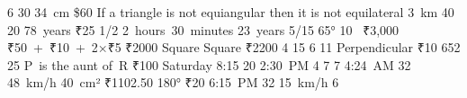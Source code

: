\answerkey
{} 6
 30
 34 cm
 \$60
 If a triangle is not equiangular then it is not equilateral
 3 km
 40
 20
 78 years
 ₹25
 1/2
 2 hours 30 minutes
 23 years
 5/15
 65°
 10 %
 ₹3,000
 ₹50 + ₹10 + 2×₹5
 ₹2000
 Square
 Square
 ₹2200
 4
 15
 6
 11
 Perpendicular
 ₹10
 652
 25
 P is the aunt of R
 ₹100
 Saturday
 8:15
 20
 2:30 PM
 4
 7
 7
 4:24 AM
 32
 48 km/h
 40 cm²
 ₹1102.50
 180°
 ₹20
 6:15 PM
 32
 15 km/h
 6
\endanswerkey